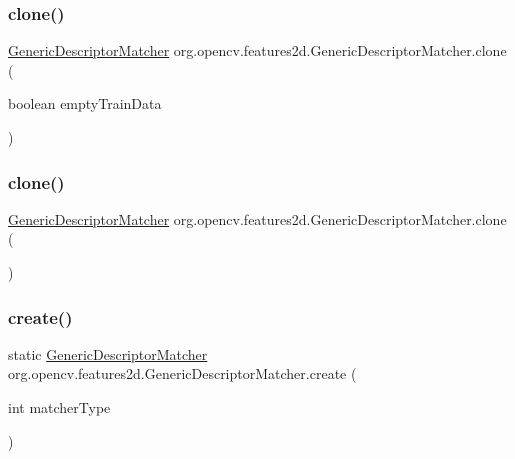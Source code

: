 \subsubsection{\texorpdfstring{clone()}{clone()}\hspace{0.1cm}{\footnotesize\ttfamily [1/2]}}
{\footnotesize\ttfamily \mbox{\hyperlink{classorg_1_1opencv_1_1features2d_1_1_generic_descriptor_matcher}{Generic\+Descriptor\+Matcher}} org.\+opencv.\+features2d.\+Generic\+Descriptor\+Matcher.\+clone (\begin{DoxyParamCaption}\item[{boolean}]{empty\+Train\+Data }\end{DoxyParamCaption})}

\mbox{\label{classorg_1_1opencv_1_1features2d_1_1_generic_descriptor_matcher_a007e317ad3a73e1d0df4809d614d7b72}} 
\subsubsection{\texorpdfstring{clone()}{clone()}\hspace{0.1cm}{\footnotesize\ttfamily [2/2]}}
{\footnotesize\ttfamily \mbox{\hyperlink{classorg_1_1opencv_1_1features2d_1_1_generic_descriptor_matcher}{Generic\+Descriptor\+Matcher}} org.\+opencv.\+features2d.\+Generic\+Descriptor\+Matcher.\+clone (\begin{DoxyParamCaption}{ }\end{DoxyParamCaption})}

\mbox{\label{classorg_1_1opencv_1_1features2d_1_1_generic_descriptor_matcher_a64b3829be52d49dd4718dda5bef37c2c}} 
\subsubsection{\texorpdfstring{create()}{create()}}
{\footnotesize\ttfamily static \mbox{\hyperlink{classorg_1_1opencv_1_1features2d_1_1_generic_descriptor_matcher}{Generic\+Descriptor\+Matcher}} org.\+opencv.\+features2d.\+Generic\+Descriptor\+Matcher.\+create (\begin{DoxyParamCaption}\item[{int}]{matcher\+Type }\end{DoxyParamCaption})\hspace{0.3cm}{\ttfamily [static]}}

